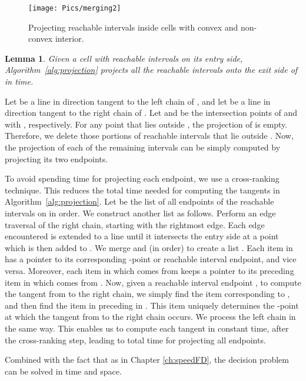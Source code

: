 \documentclass[12pt]{dalthesis}
\def\favoritefont{\bfseries \sffamily}
\def\QED{\ensuremath{{\Box}}}
\def\markatright#1{\leavevmode\unskip\nobreak\quad\hspace*{\fill}{#1}}
\newenvironment{proof}
	{\begin{trivlist}\item[\hskip\labelsep{\favoritefont Proof:}]}
	{\markatright{\QED}\end{trivlist}}
\newtheorem{lemma}[theorem]{Lemma}
\begin{document}
\begin{figure}[h]
	\centering
	\texttt{[image: Pics/merging2]}
	\caption{ 
Projecting reachable intervals inside cells with convex and non-convex interior. 
	}
	\label{fig:merging}
\end{figure}


\begin{lemma} \label{thm:naive}
	Given a cell  with  reachable intervals on its entry side, 
	Algorithm~\ref{alg:projection} projects all the reachable intervals onto the exit side of 
	in  time.
\end{lemma}

\begin{proof}
Let  be a line in direction  
tangent to the left chain of ,
and let  be a line in direction  
tangent to the right chain of .
Let  and  be the intersection points of  and 
with , respectively.
For any point 
that lies outside , the projection of  is empty. Therefore, we delete those portions of reachable intervals
that lie outside . 
Now, the projection of each of the remaining intervals can be simply computed 
by projecting its two endpoints.


To avoid spending  time for projecting each endpoint, 
we use a cross-ranking technique. This reduces the total time needed for computing the tangents in Algorithm~\ref{alg:projection}.
Let  be the list of all endpoints of the reachable intervals on  in  order.
We construct another list  as follows. 
Perform an edge traversal of the right chain, starting with the rightmost edge.
Each edge encountered is extended to a line until it intersects the entry side at a point
which is then added to .
We merge  and  (in  order) to create a list .
Each item in  has a pointer to its corresponding -point or reachable interval endpoint, and vice versa.
Moreover, each item in  which comes from 
keeps a pointer to its preceding item in  which comes from .
Now, given a reachable interval endpoint , to compute the tangent from  to the right chain,
we simply find the item  corresponding to , 
and then find the item in  preceding  in . This item
uniquely determines the -point at which the tangent from  to the right chain occurs.
We process the left chain in the same way.
This enables us to compute each tangent in constant time, after the cross-ranking step,
leading to  total time for projecting all endpoints.
\end{proof}

Combined with the fact that  as in Chapter \ref{ch:speedFD},
the decision problem can be solved in  time and  space.
\end{document}
